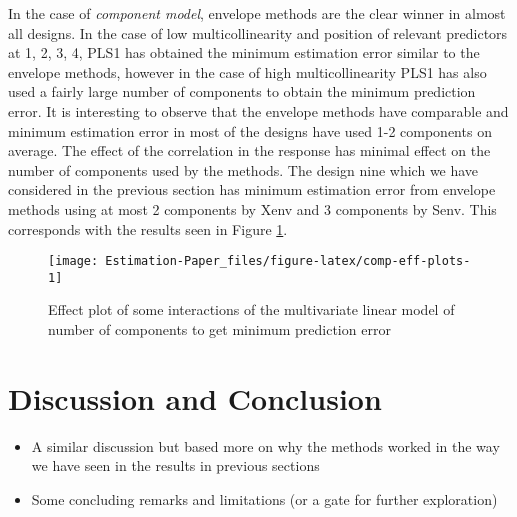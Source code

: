 \documentclass[12pt,3p,authoryear]{elsarticle}
\providecommand{\tightlist}{%
  \setlength{\itemsep}{0pt}\setlength{\parskip}{0pt}}
\begin{document}
In the case of \emph{component model}, envelope methods are the clear
winner in almost all designs. In the case of low multicollinearity and
position of relevant predictors at 1, 2, 3, 4, PLS1 has obtained the
minimum estimation error similar to the envelope methods, however in the
case of high multicollinearity PLS1 has also used a fairly large number
of components to obtain the minimum prediction error. It is interesting
to observe that the envelope methods have comparable and minimum
estimation error in most of the designs have used 1-2 components on
average. The effect of the correlation in the response has minimal
effect on the number of components used by the methods. The design nine
which we have considered in the previous section has minimum estimation
error from envelope methods using at most 2 components by Xenv and 3
components by Senv. This corresponds with the results seen in Figure
\ref{fig:comp-eff-plots}.




\begin{figure}[!htb]
\texttt{[image: Estimation-Paper\_files/figure-latex/comp-eff-plots-1]} \caption{Effect plot of some interactions of the multivariate
linear model of number of components to get minimum prediction error}\label{fig:comp-eff-plots}
\end{figure}

\section{Discussion and Conclusion}\label{discussion-and-conclusion}

\begin{itemize}
\tightlist
\item
  A similar discussion but based more on why the methods worked in the
  way we have seen in the results in previous sections
\item
  Some concluding remarks and limitations (or a gate for further
  exploration)
\end{itemize}

\hypertarget{refs}{}


\renewcommand\refname{References}

\end{document}
